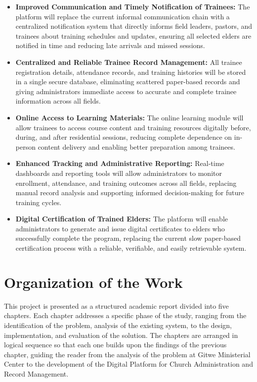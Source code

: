 \documentclass[12pt]{report}
\begin{document}
\begin{itemize}
    \item \textbf{Improved Communication and Timely Notification of Trainees:} The platform will replace the current informal communication chain with a centralized notification system that directly informs field leaders, pastors, and trainees about training schedules and updates, ensuring all selected elders are notified in time and reducing late arrivals and missed sessions.
    \item \textbf{Centralized and Reliable Trainee Record Management:} All trainee registration details, attendance records, and training histories will be stored in a single secure database, eliminating scattered paper-based records and giving administrators immediate access to accurate and complete trainee information across all fields.
    \item \textbf{Online Access to Learning Materials:} The online learning module will allow trainees to access course content and training resources digitally before, during, and after residential sessions, reducing complete dependence on in-person content delivery and enabling better preparation among trainees.
    \item \textbf{Enhanced Tracking and Administrative Reporting:} Real-time dashboards and reporting tools will allow administrators to monitor enrollment, attendance, and training outcomes across all fields, replacing manual record analysis and supporting informed decision-making for future training cycles.
    \item \textbf{Digital Certification of Trained Elders:} The platform will enable administrators to generate and issue digital certificates to elders who successfully complete the program, replacing the current slow paper-based certification process with a reliable, verifiable, and easily retrievable system.
\end{itemize}

\section{Organization of the Work}
This project is presented as a structured academic report divided into five chapters. Each chapter addresses a specific phase of the study, ranging from the identification of the problem, analysis of the existing system, to the design, implementation, and evaluation of the solution. The chapters are arranged in logical sequence so that each one builds upon the findings of the previous chapter, guiding the reader from the analysis of the problem at Gitwe Ministerial Center to the development of the Digital Platform for Church Administration and Record Management.
\end{document}
